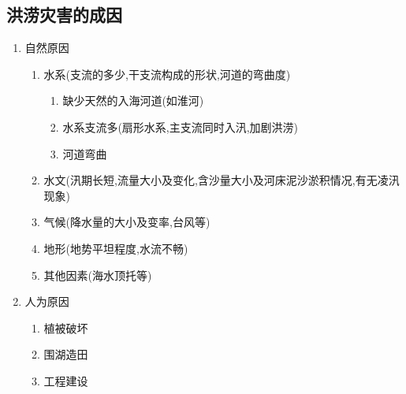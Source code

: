 \documentclass[a4paper]{article}
\begin{document}
    \subsection{洪涝灾害的成因}
    \begin{enumerate}
        \item 自然原因
        \begin{enumerate}
            \item 水系(支流的多少,干支流构成的形状,河道的弯曲度)
            \begin{enumerate}
                \item 缺少天然的入海河道(如淮河)
                \item 水系支流多(扇形水系,主支流同时入汛,加剧洪涝)
                \item 河道弯曲
            \end{enumerate}
            \item 水文(汛期长短,流量大小及变化,含沙量大小及河床泥沙淤积情况,有无凌汛现象)
            \item 气候(降水量的大小及变率,台风等)
            \item 地形(地势平坦程度,水流不畅)
            \item 其他因素(海水顶托等)
        \end{enumerate}
        \item 人为原因
        \begin{enumerate}
            \item 植被破坏
            \item 围湖造田
            \item 工程建设
        \end{enumerate}
    \end{enumerate}
\end{document}
